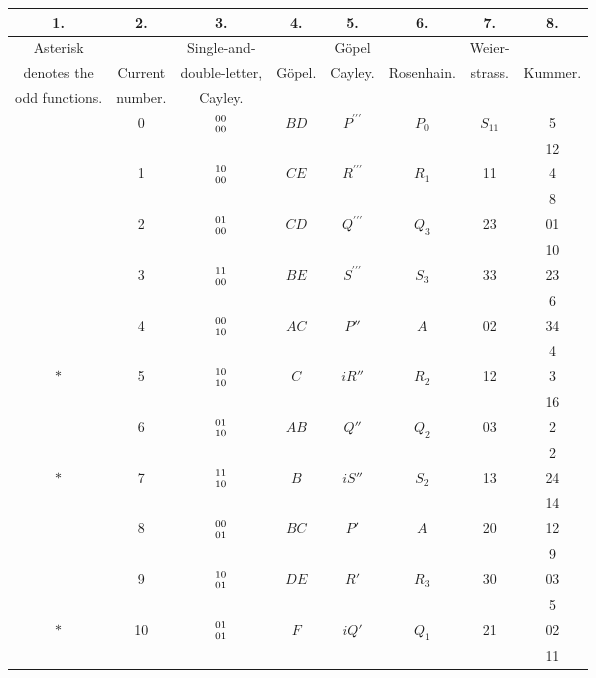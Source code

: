 \documentclass[11pt]{article}
\begin{document}
\begin{center}
\small
\begin{tabular}{|c|c|c|c|c|c|c|c|}
\hline
1. & 2. & 3. & 4. & 5. & 6. & 7. & 8.\\
\hline
Asterisk & & Single-and- & & G\"opel & & Weier- & \\
denotes the & Current & double-letter, & G\"opel. & Cayley. & Rosenhain. & strass. & Kummer.\\
odd functions. & number. & Cayley. & & & & & \\
\hline
 & 0 & $\genfrac{}{}{0pt}{}{00}{00}$ & $BD$ & $P^{\prime\prime\prime}$ & $P_0$ & $S_{11}$ & 5 \\
 & & & & & & & 12 \\
\hline
 & 1 & $\genfrac{}{}{0pt}{}{10}{00}$ & $CE$ & $R^{\prime\prime\prime}$ & $R_1$ & 11 & 4 \\
 & & & & & & & 8 \\
\hline
 & 2 & $\genfrac{}{}{0pt}{}{01}{00}$ & $CD$ & $Q^{\prime\prime\prime}$ & $Q_3$ & 23 & 01 \\
 & & & & & & & 10 \\
\hline
 & 3 & $\genfrac{}{}{0pt}{}{11}{00}$ & $BE$ & $S^{\prime\prime\prime}$ & $S_3$ & 33 & 23 \\
 & & & & & & & 6 \\
\hline
 & 4 & $\genfrac{}{}{0pt}{}{00}{10}$ & $AC$ & $P''$ & $A$ & 02 & 34 \\
 & & & & & & & 4 \\
\hline
$*$ & 5 & $\genfrac{}{}{0pt}{}{10}{10}$ & $C$ & $iR''$ & $R_2$ & 12 & 3 \\
 & & & & & & & 16 \\
\hline
 & 6 & $\genfrac{}{}{0pt}{}{01}{10}$ & $AB$ & $Q''$ & $Q_2$ & 03 & 2 \\
 & & & & & & & 2 \\
\hline
$*$ & 7 & $\genfrac{}{}{0pt}{}{11}{10}$ & $B$ & $iS''$ & $S_2$ & 13 & 24 \\
 & & & & & & & 14 \\
\hline
 & 8 & $\genfrac{}{}{0pt}{}{00}{01}$ & $BC$ & $P'$ & $A$ & 20 & 12 \\
 & & & & & & & 9 \\
\hline
 & 9 & $\genfrac{}{}{0pt}{}{10}{01}$ & $DE$ & $R'$ & $R_3$ & 30 & 03 \\
 & & & & & & & 5 \\
\hline
$*$ & 10 & $\genfrac{}{}{0pt}{}{01}{01}$ & $F$ & $iQ'$ & $Q_1$ & 21 & 02 \\
 & & & & & & & 11 \\

\end{tabular}
\end{center}
\end{document}
